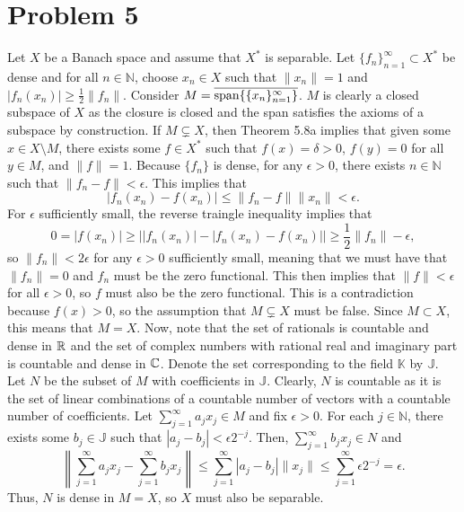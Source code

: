\documentclass{article}
\begin{document}
\section{Problem 5}
Let $X$ be a Banach space and assume that $X^*$ is separable. Let $\{f_n\}_{n=1}^\infty\subset X^*$ be dense and for all $n\in\mathbb{N}$, choose $x_n\in X$ such that $\|x_n\|=1$ and $|f_n(x_n)|\geq\frac{1}{2}\|f_n\|$. Consider $M=\overline{\operatorname{span}\{\{x_n\}_{n=1}^\infty\}}$. $M$ is clearly a closed subspace of $X$ as the closure is closed and the span satisfies the axioms of a subspace by construction. If $M\subsetneq X$, then Theorem 5.8a implies that given some $x\in X\setminus M$, there exists some $f\in X^*$ such that $f(x)=\delta>0$, $f(y)=0$ for all $y\in M$, and $\|f\|=1$. Because $\{f_n\}$ is dense, for any $\epsilon>0$, there exists $n\in\mathbb{N}$ such that $\|f_n-f\|<\epsilon$. This implies that
\[
|f_n(x_n)-f(x_n)|\leq \|f_n-f\|\|x_n\|<\epsilon.
\]
For $\epsilon$ sufficiently small, the reverse traingle inequality implies that
\[
0=|f(x_n)|\geq \left||f_n(x_n)|-|f_n(x_n)-f(x_n)|\right|\geq\frac{1}{2}\|f_n\|-\epsilon,
\]
so $\|f_n\|<2\epsilon$ for any $\epsilon>0$ sufficiently small, meaning that we must have that $\|f_n\|=0$ and $f_n$ must be the zero functional. This then implies that $\|f\|<\epsilon$ for all $\epsilon>0$, so $f$ must also be the zero functional. This is a contradiction because $f(x)>0$, so the assumption that $M\subsetneq X$ must be false. Since $M\subset X$, this means that $M=X$. Now, note that the set of rationals is countable and dense in $\mathbb{R}$ and the set of complex numbers with rational real and imaginary part is countable and dense in $\mathbb{C}$. Denote the set corresponding to the field $\mathbb{K}$ by $\mathbb{J}$. Let $N$ be the subset of $M$ with coefficients in $\mathbb{J}$. Clearly, $N$ is countable as it is the set of linear combinations of a countable number of vectors with a countable number of coefficients. Let $\sum_{j=1}^\infty a_jx_j\in M$ and fix $\epsilon>0$. For each $j\in\mathbb{N}$, there exists some $b_j\in\mathbb{J}$ such that $|a_j-b_j|<\epsilon2^{-j}$. Then, $\sum_{j=1}^\infty b_jx_j\in N$ and 
\[
\left\|\sum_{j=1}^\infty a_jx_j-\sum_{j=1}^\infty b_jx_j\right\|\leq\sum_{j=1}^\infty|a_j-b_j|\|x_j\|\leq\sum_{j=1}^\infty\epsilon2^{-j}=\epsilon.
\]
Thus, $N$ is dense in $M=X$, so $X$ must also be separable.
\end{document}
